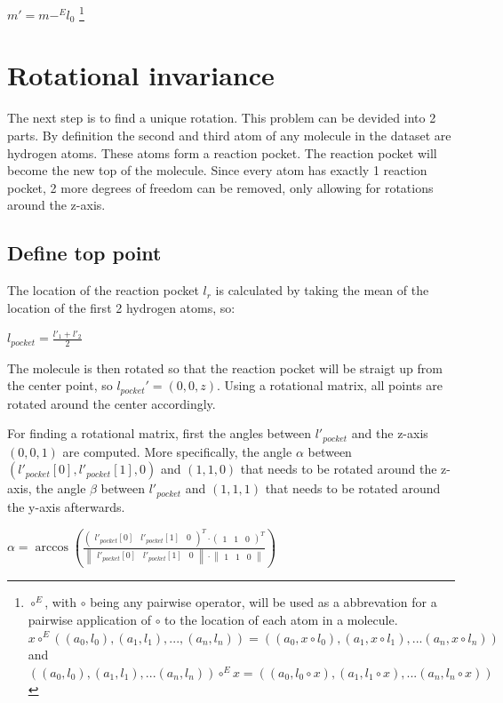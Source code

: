 $m' = m -^E l_0$ \footnote{$\circ^E$, with $\circ$ being any pairwise operator, will be used as a abbrevation for a pairwise application of $\circ$ to the location of each atom in a molecule.
\\
$x \circ^E ((a_0, l_0), (a_1, l_1), ... ,(a_n, l_n)) = ((a_0, x \circ l_0), (a_1, x \circ l_1), ... (a_n, x \circ l_n))$
\\
and
\\
$((a_0, l_0), (a_1, l_1), ... (a_n, l_n)) \circ^E x = ((a_0, l_0 \circ x), (a_1, l_1 \circ x), ... (a_n, l_n \circ x))$
}


\section{Rotational invariance}

The next step is to find a unique rotation.
This problem can be devided into 2 parts.
By definition the second and third atom of any molecule in the dataset are hydrogen atoms.
These atoms form a reaction pocket. %
The reaction pocket will become the new top of the molecule.
Since every atom has exactly 1 reaction pocket, 2 more degrees of freedom can be removed, only allowing for rotations around the z-axis.


\subsection{Define top point}

The location of the reaction pocket $l_r$ is calculated by taking the mean of the location of the first 2 hydrogen atoms, so:

$l_{pocket} = \frac{l'_1 + l'_2}{2}$

The molecule is then rotated so that the reaction pocket will be straigt up from the center point, so $l_{pocket}' = (0,0,z)$.
Using a rotational matrix, all points are rotated around the center accordingly.

For finding a rotational matrix, first the angles between $l'_{pocket}$ and the z-axis $(0,0,1)$ are computed.
More specifically, the angle $\alpha$ between $(l'_{pocket}[0], l'_{pocket}[1], 0)$ and $(1,1,0)$ that needs to be rotated around the z-axis, 
the angle $\beta$ between $l'_{pocket}$ and $(1,1,1)$ that needs to be rotated around the y-axis afterwards.

$\alpha = \arccos \left(
  \frac{
  \begin{pmatrix}
    l'_{pocket}[0] &
    l'_{pocket}[1] &
    0
  \end{pmatrix}^T
  \cdot 
  \begin{pmatrix}
    1 &
    1 &
    0
  \end{pmatrix}^T}
  {
  \begin{Vmatrix}
    l'_{pocket}[0] &
    l'_{pocket}[1] &
    0
  \end{Vmatrix}
  \cdot 
  \begin{Vmatrix}
    1 &
    1 &
    0
  \end{Vmatrix}}
\right)
$

